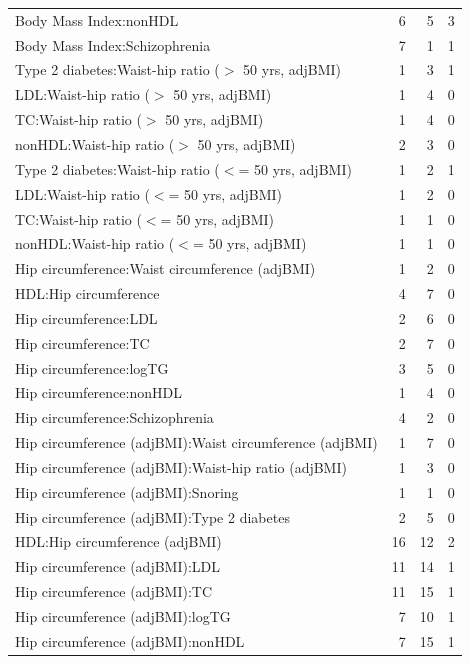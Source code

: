 \begin{table}[ht]
\begin{tabular}{lrrr}
  Body Mass Index:nonHDL &   6 &   5 &   3 \\ 
  Body Mass Index:Schizophrenia &   7 &   1 &   1 \\ 
  Type 2 diabetes:Waist-hip ratio ($>$ 50 yrs, adjBMI) &   1 &   3 &   1 \\ 
  LDL:Waist-hip ratio ($>$ 50 yrs, adjBMI) &   1 &   4 &   0 \\ 
  TC:Waist-hip ratio ($>$ 50 yrs, adjBMI) &   1 &   4 &   0 \\ 
  nonHDL:Waist-hip ratio ($>$ 50 yrs, adjBMI) &   2 &   3 &   0 \\ 
  Type 2 diabetes:Waist-hip ratio ($<$= 50 yrs, adjBMI) &   1 &   2 &   1 \\ 
  LDL:Waist-hip ratio ($<$= 50 yrs, adjBMI) &   1 &   2 &   0 \\ 
  TC:Waist-hip ratio ($<$= 50 yrs, adjBMI) &   1 &   1 &   0 \\ 
  nonHDL:Waist-hip ratio ($<$= 50 yrs, adjBMI) &   1 &   1 &   0 \\ 
  Hip circumference:Waist circumference (adjBMI) &   1 &   2 &   0 \\ 
  HDL:Hip circumference &   4 &   7 &   0 \\ 
  Hip circumference:LDL &   2 &   6 &   0 \\ 
  Hip circumference:TC &   2 &   7 &   0 \\ 
  Hip circumference:logTG &   3 &   5 &   0 \\ 
  Hip circumference:nonHDL &   1 &   4 &   0 \\ 
  Hip circumference:Schizophrenia &   4 &   2 &   0 \\ 
  Hip circumference (adjBMI):Waist circumference (adjBMI) &   1 &   7 &   0 \\ 
  Hip circumference (adjBMI):Waist-hip ratio (adjBMI) &   1 &   3 &   0 \\ 
  Hip circumference (adjBMI):Snoring &   1 &   1 &   0 \\ 
  Hip circumference (adjBMI):Type 2 diabetes &   2 &   5 &   0 \\ 
  HDL:Hip circumference (adjBMI) &  16 &  12 &   2 \\ 
  Hip circumference (adjBMI):LDL &  11 &  14 &   1 \\ 
  Hip circumference (adjBMI):TC &  11 &  15 &   1 \\ 
  Hip circumference (adjBMI):logTG &   7 &  10 &   1 \\ 
  Hip circumference (adjBMI):nonHDL &   7 &  15 &   1 \\ 

\end{tabular}
\end{table}
